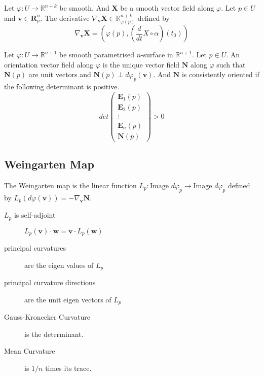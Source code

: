 \begin{definition}
	Let $\varphi : U \to \mathbb{R}^{n+k}$ be smooth.
	And $\mathbf{X}$ be a smooth vector field along $\varphi$.
	Let $p \in U$ and $\mathbf{v} \in \mathbf{R}_p^n$.
	The derivative $\nabla_\mathbf{v} \mathbf{X} \in \mathbb{R}_{\varphi(p)}^{n+k}$ defined by
\begin{equation}
	\nabla_\mathbf{v} \mathbf{X} = \left( \varphi(p), \left( \frac{d}{dt} X \circ \alpha \right) (t_0) \right)
\end{equation}
\end{definition}

\begin{definition}
	Let $\varphi : U \to \mathbb{R}^{n+1}$ be smooth parametrised $n$-surface in $\mathbb{R}^{n+1}$.
	Let $p \in U$.
	An orientation vector field along $\varphi$ is the unique vector field $\mathbf{N}$ along $\varphi$ such that $\mathbf{N}(p)$ are unit vectors and $\mathbf{N}(p) \perp d\varphi_p(\mathbf{v})$.
	And $\mathbf{N}$ is consistently oriented if the following determinant is positive.
	\begin{equation}
		det\begin{pmatrix} \mathbf{E}_1(p) \\ \mathbf{E}_2(p) \\ \vdots \\ \mathbf{E}_n(p) \\ \mathbf{N}(p) \end{pmatrix} > 0
	\end{equation}
\end{definition}

\subsection{Weingarten Map}
\begin{definition}
	The Weingarten map is the linear function $L_p : \text{Image } d\varphi_p \to \text{Image }d\varphi_p$ defined by $L_p(d\varphi(\mathbf{v})) = -\nabla_\mathbf{v} \mathbf{N}$.
\end{definition}

\begin{description}
	\item[$L_p$ is self-adjoint] $L_p(\mathbf{v}) \cdot \mathbf{w} = \mathbf{v} \cdot L_p(\mathbf{w})$
	\item[principal curvatures] are the eigen values of $L_p$
	\item[principal curvature directions] are the unit eigen vectors of $L_p$
	\item[Gauss-Kronecker Curvature] is the determinant.
	\item[Mean Curvature] is $1/n$ times its trace.
\end{description}

